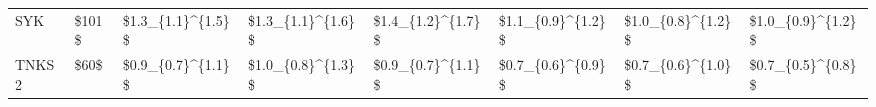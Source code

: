 \begin{tabular}{llllllll}
SYK    &  \$101\$ &  \$1.3\_\{1.1\}\textasciicircum \{1.5\}\$ &  \$1.3\_\{1.1\}\textasciicircum \{1.6\}\$ &  \$1.4\_\{1.2\}\textasciicircum \{1.7\}\$ &  \$1.1\_\{0.9\}\textasciicircum \{1.2\}\$ &  \$1.0\_\{0.8\}\textasciicircum \{1.2\}\$ &  \$1.0\_\{0.9\}\textasciicircum \{1.2\}\$ \\
TNKS2  &   \$60\$ &  \$0.9\_\{0.7\}\textasciicircum \{1.1\}\$ &  \$1.0\_\{0.8\}\textasciicircum \{1.3\}\$ &  \$0.9\_\{0.7\}\textasciicircum \{1.1\}\$ &  \$0.7\_\{0.6\}\textasciicircum \{0.9\}\$ &  \$0.7\_\{0.6\}\textasciicircum \{1.0\}\$ &  \$0.7\_\{0.5\}\textasciicircum \{0.8\}\$ \\
\bottomrule
\end{tabular}
